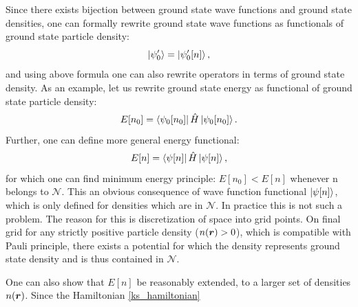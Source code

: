 \documentclass[openany, longbibliography,slovene,a4paper,12pt]{article}
\def\vec#1{\mbox{\boldmath$#1$}}
\begin{document}
Since there exists bijection between ground state wave functions and ground
state densities, one can formally rewrite ground state wave functions as functionals of ground
state particle density:
\begin{equation}
  \ket{\psi'_0} =  \ket{\psi'_0[n]},
  \end{equation}
and using above formula one can also rewrite operators in terms of ground state
density. As an example, let us rewrite ground state energy as functional of
ground state particle density:
\begin{equation}
  E[n_0] = \bra{\psi_0[n_0]}\hat H \ket{\psi_0[n_0]}.
  \end{equation}
  Further, one can define more general energy functional:
\begin{equation}
  E[n] = \bra{\psi[n]}\hat H \ket{\psi[n]},
\end{equation}
for which one can find minimum energy principle: $E[n_0]<E[n]$ whenever n
belongs to $\mathcal N$. This an obvious consequence of wave function functional
$\ket{\psi [n]}$, which is only defined for densities which are in $\mathcal N$.
In practice this is not such a problem. The reason for this is discretization of space into
grid points. On final grid for any strictly positive particle density ($n(\vec r) > 0$),
which is compatible with Pauli principle, there exists a  potential for which the
density represents ground state density and is thus contained in $\mathcal N$.

One can also show that $E[n]$ be reasonably extended, to a larger set of
densities $n(\vec r)$. Since the Hamiltonian \ref{ks_hamiltonian}
\end{document}
